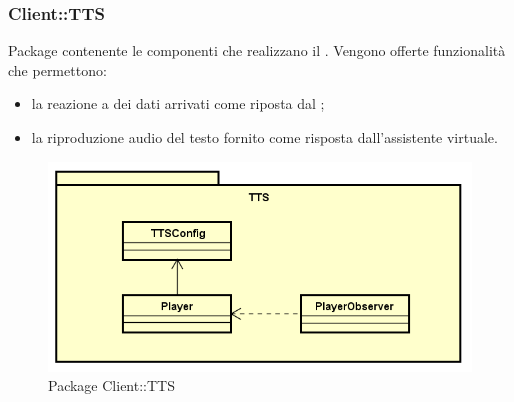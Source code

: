 \subsubsection{Client::TTS}
Package contenente le componenti che realizzano il .
Vengono offerte funzionalità che permettono:
\begin{itemize}
\item la reazione a dei dati arrivati come riposta dal ;
\item la riproduzione audio del testo fornito come risposta dall'assistente virtuale.
\end{itemize}
\begin{figure}[h] \centering \includegraphics[width=\textwidth,height=\textheight,keepaspectratio]{images/diagrams/client/Client/TTS.png}
	\caption{Package Client::TTS}
\end{figure}

